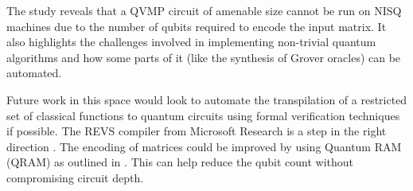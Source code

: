 \documentclass[11pt]{article}
\theoremstyle{definition}
\theoremstyle{remark}
\begin{document}
The study reveals that a QVMP circuit of amenable size cannot be run on NISQ
machines due to the number of qubits required to encode the input matrix. It
also highlights the challenges involved in implementing non-trivial quantum
algorithms and how some parts of it (like the synthesis of Grover oracles) can
be automated.

Future work in this space would look to automate the transpilation of a
restricted set of classical functions to quantum circuits using formal
verification techniques if possible. The REVS compiler from Microsoft Research
is a step in the right direction \cite{amy2017verified}. The encoding of
matrices could be improved by using Quantum RAM (QRAM) as outlined in
\cite{giovannetti2008quantum}. This can help reduce the qubit count without
compromising circuit depth.

\newpage

\printbibliography[title=Bibliography]
\end{document}
